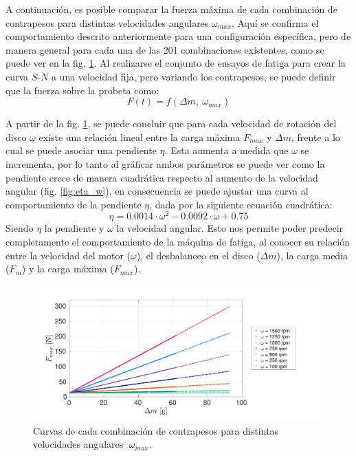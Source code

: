 A continuación, es posible comparar la fuerza máxima de cada combinación de contrapesos para distintas velocidades angulares $\omega_{max}$. Aquí se confirma el comportamiento descrito anteriormente para una configuración específica, pero de manera general para cada una de las 201 combinaciones existentes, como se puede ver en la fig. \ref{fig:fmax_dm}. Al realizarse el conjunto de ensayos de fatiga para crear la curva $S$-$N$ a una velocidad fija, pero variando los contrapesos, se puede definir que la fuerza sobre la probeta como:
\begin{equation}\label{eq:func_psiomega}
	F(t) = f(\Delta m,\: \omega_{max})
\end{equation}

A partir de la fig. \ref{fig:fmax_dm}, se puede concluir que para cada velocidad de rotación del disco $\omega$ existe una relación lineal entre la carga máxima $F_{max}$ y $\Delta m$, frente a lo cual se puede asociar una pendiente $\eta$. Esta aumenta a medida que $\omega$ se incrementa, por lo tanto al gráficar ambos parámetros se puede ver como la pendiente crece de manera cuadrática respecto al aumento de la velocidad angular (fig. \ref{fig:eta_w}), en consecuencia se puede ajustar una curva al comportamiento de la pendiente $\eta$, dada por la siguiente ecuación cuadrática:
\begin{equation}
	\eta = 0.0014\cdot \omega^2 - 0.0092\cdot \omega + 0.75
\end{equation}
Siendo $\eta$ la pendiente y $\omega$ la velocidad angular. Esto nos permite poder predecir completamente el comportamiento de la máquina de fatiga, al conocer su relación entre la velocidad del motor ($\omega$), el desbalanceo en el disco ($\Delta m$), la carga media ($F_m$) y la carga máxima ($F_{max}$).

\begin{figure}
\centering
\includegraphics[width=1\linewidth, trim={1cm 0cm 3cm 1cm}, clip]{Imagenes/fmax_dm.pdf}
\caption{Curvas de cada combinación de contrapesos para distintas velocidades angulares $\; \omega_{max}$.}
\label{fig:fmax_dm}
\end{figure}

